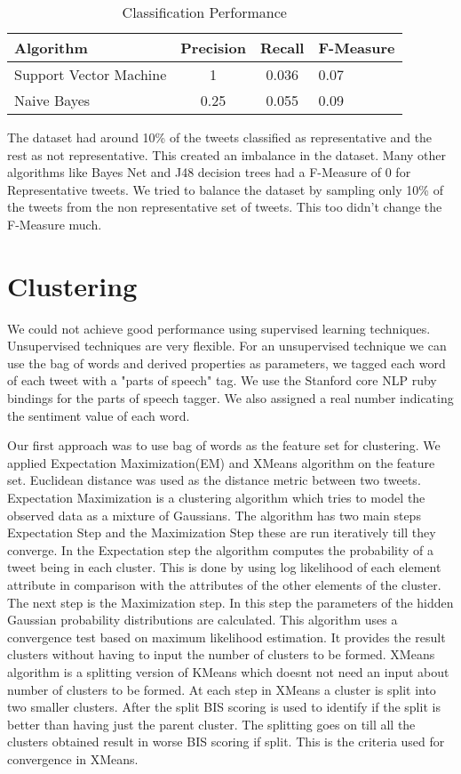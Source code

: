 \begin{table}
\caption{Classification Performance}
\label{tab:one}
\begin{center}
\begin{tabular}{lccl}
\toprule
Algorithm & Precision & Recall & F-Measure\\
\midrule
Support Vector Machine & 1 & 0.036 & 0.07\\
Naive  Bayes  & 0.25 & 0.055 & 0.09\\
\bottomrule
\end{tabular}
\end{center}
\end{table}


The dataset had around 10\% of the tweets classified as representative and the rest as not representative. This created an imbalance in the dataset. Many other algorithms like Bayes Net and J48 decision trees had a F-Measure of 0 for Representative tweets. We tried to balance the dataset by sampling only 10\% of the tweets from the non representative set of tweets. This too didn't change the F-Measure much. 

\section{Clustering}
We could not achieve good performance using supervised learning techniques. Unsupervised techniques are very flexible. For an unsupervised technique we can use the bag of words and derived properties as parameters, we tagged each word of each tweet with a "parts of speech" tag. We use the Stanford core NLP\cite{stanfordcorenlplink} ruby bindings for the parts of speech tagger.  We also assigned a real number indicating the sentiment value of each word. 

Our first approach was to use bag of words as the feature set for clustering. We applied Expectation Maximization(EM)\cite{Gupta:2010:DNC:1798337.1798433} and XMeans \cite{Pelleg:2000:XEK:645529.657808} algorithm on the feature set. Euclidean distance was used as the distance metric between two tweets. Expectation Maximization is a clustering algorithm which tries to model the observed data as a mixture of Gaussians. The algorithm has two main steps Expectation Step and the Maximization Step these are run iteratively till they converge. In the Expectation step the algorithm computes the probability of a tweet being in each cluster. This is done by using log likelihood of each element attribute in comparison with the attributes of the other elements of the cluster. The next step is the Maximization step. In this step the parameters of the hidden Gaussian probability distributions are calculated. This algorithm uses a convergence test based on maximum likelihood estimation. It provides the result clusters without having to input the number of clusters to be formed. XMeans algorithm is a splitting version of KMeans which doesnt not need an input about number of clusters to be formed. At each step in XMeans a cluster is split into two smaller clusters. After the split BIS scoring is used to identify if the split is better than having just the parent cluster. The splitting goes on till all the clusters obtained result in worse BIS scoring if split. This is the criteria used for convergence in XMeans. 

